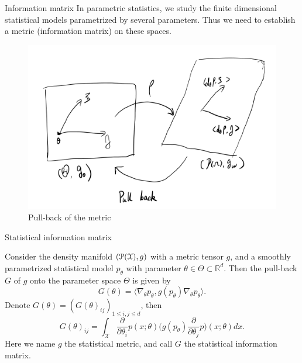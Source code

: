 \documentclass{beamer}
\begin{document}
\begin{frame}{Information matrix}
    In parametric statistics, we study the finite dimensional statistical models parametrized by several parameters. Thus we need to establish a metric (information matrix) on these spaces.
    \begin{figure}[H]
          \centering
          \centerline{\includegraphics[width=0.5\linewidth]{pull_back.png}}
          \caption{Pull-back of the metric}
    \end{figure}
\end{frame}




\begin{frame}{Statistical information matrix}

    \begin{definition}
	Consider the density manifold $(\mathcal{P}(\mathcal{X}), g)$ with a metric tensor $g$, and a smoothly parametrized statistical model $ p_\theta$ with parameter $\theta\in\Theta \subset \mathbb{R}^d$. 
	Then the pull-back $G$ of $g$ onto the parameter space $\Theta$ is given by
	\begin{equation*}
	G(\theta)=\Big\langle \nabla_\theta p_\theta, g( p_\theta) \nabla_\theta p_\theta\Big\rangle.
	\end{equation*}
Denote $G(\theta)=(G(\theta)_{ij})_{1\leq i,j\leq d}$, then 
\begin{equation*}
G(\theta)_{ij}=\int_{\mathcal{X}}{\frac{\partial}{\partial \theta_i}p(x;\theta)\Big(g(p_\theta)\frac{\partial}{\partial \theta_j}p\Big)(x;\theta)}dx.
\end{equation*}
Here we name $g$ the statistical metric, and call $G$ the statistical information matrix.
\end{definition}
\end{frame}
\end{document}
